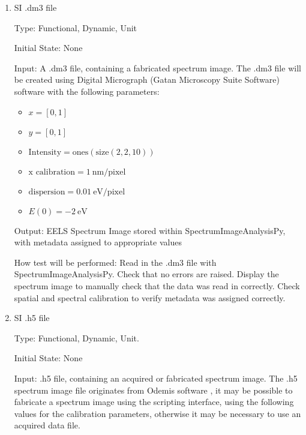 \documentclass[12pt, titlepage]{article}
\newcommand{\progname}{SpectrumImageAnalysisPy}
\begin{document}
\begin{enumerate}
How test will be performed: Create a 3D data array and attempt to initialize a
spectrum image in \progname{}. No errors should be raised. The spectrum image
axes should be read in the correct order (x, y, E), and the calibrations should
be applied to the correct axes.


\item{SI .dm3 file}

Type: Functional, Dynamic, Unit

Initial State: None

Input: A .dm3 file, containing a fabricated spectrum image. The .dm3 file will
be created using Digital Micrograph (Gatan Microscopy Suite Software) software
\cite{gatan_inc._gatan_nodate} with the following parameters:
\begin{itemize}
	\item $x = [0, 1]$
	\item $y = [0, 1]$
	\item $\text{Intensity} = \text{ones}(\text{size}(2,2,10))$
	\item $\text{x calibration} = 1\ \si{\nano\metre}/\text{pixel}$
	\item $\text{dispersion} = 0.01\ \si{\electronvolt}/\text{pixel}$
	\item $E(0) = -2\ \si{\electronvolt}$
\end{itemize}

Output: EELS Spectrum Image stored within \progname{}, with metadata assigned to
appropriate values

How test will be performed: Read in the .dm3 file with \progname{}. Check that
no errors are raised. Display the spectrum image to manually check that the data
was read in correctly. Check spatial and spectral calibration to verify metadata
was assigned correctly.


\item{SI .h5 file}

Type: Functional, Dynamic, Unit.

Initial State: None

Input: .h5 file, containing an acquired or fabricated spectrum image. The .h5
spectrum image file originates from Odemis software \cite{bv_odemis:_nodate}, it
may be possible to fabricate a spectrum image using the scripting interface,
using the following values for the calibration parameters, otherwise it may be
necessary to use an acquired data file.


\end{enumerate}
\end{document}
